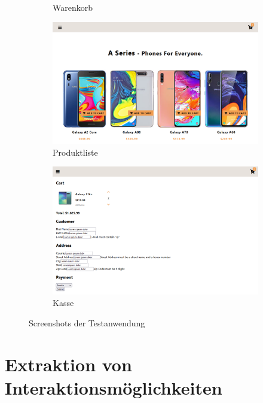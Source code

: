 \begin{figure}
\begin{subfigure}[b]{0.32\textwidth}
        \caption{Warenkorb}
        \label{fig:online-shopping-website-cart}
    \end{subfigure}
    
    \begin{subfigure}[b]{0.9\textwidth}
        \centering
        \includegraphics[width=\textwidth]{pictures/Products_Half.png}
        \caption{Produktliste}
        \label{fig:online-shopping-website-product-list}
    \end{subfigure}
    \begin{subfigure}[b]{0.9\textwidth}
        \centering
        \includegraphics[width=\textwidth]{pictures/Checkout.png}
        \caption{Kasse}
        \label{fig:online-shopping-website-checkout}
    \end{subfigure}

    \caption{Screenshots der Testanwendung}
    \label{fig:online-shopping-website}
\end{figure}

\section{Extraktion von Interaktionsmöglichkeiten}

